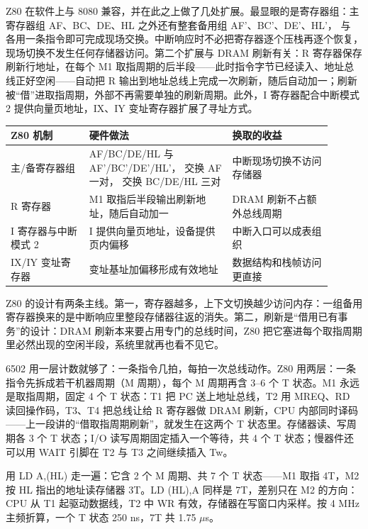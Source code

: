 Z80 在软件上与 8080 兼容，并在此之上做了几处扩展。最显眼的是寄存器组：主寄存器组 AF、BC、DE、HL 之外还有整套备用组 AF'、BC'、DE'、HL'， 与  各用一条指令即可完成现场交换。中断响应时不必把寄存器逐个压栈再逐个恢复，现场切换不发生任何存储器访问。第二个扩展与 DRAM 刷新有关：R 寄存器保存刷新行地址，在每个 M1 取指周期的后半段——此时指令字节已经读入、地址总线正好空闲——自动把 R 输出到地址总线上完成一次刷新，随后自动加一；刷新被“借”进取指周期，外部不再需要单独的刷新周期。此外，I 寄存器配合中断模式 2 提供向量页地址，IX、IY 变址寄存器扩展了寻址方式。

\begin{longtable}{L{0.22\linewidth}L{0.4\linewidth}L{0.28\linewidth}}
\toprule
Z80 机制 & 硬件做法 & 换取的收益 \\
\midrule
主/备寄存器组 & AF/BC/DE/HL 与 AF'/BC'/DE'/HL'， 交换 AF 一对， 交换 BC/DE/HL 三对 & 中断现场切换不访问存储器 \\
R 寄存器 & M1 取指后半段输出刷新地址，随后自动加一 & DRAM 刷新不占额外总线周期 \\
I 寄存器与中断模式 2 & I 提供向量页地址，设备提供页内偏移 & 中断入口可以成表组织 \\
IX/IY 变址寄存器 & 变址基址加偏移形成有效地址 & 数据结构和栈帧访问更直接 \\
\bottomrule
\end{longtable}

Z80 的设计有两条主线。第一，寄存器越多，上下文切换越少访问内存：一组备用寄存器换来的是中断响应里整段存储器往返的消失。第二，刷新是“借用已有事务”的设计：DRAM 刷新本来要占用专门的总线时间，Z80 把它塞进每个取指周期里必然出现的空闲半段，系统里就再也看不见它。

6502 用一层计数就够了：一条指令几拍，每拍一次总线动作。Z80 用两层：一条指令先拆成若干机器周期（M 周期），每个 M 周期再含 3--6 个 T 状态。M1 永远是取指周期，固定 4 个 T 状态：T1 把 PC 送上地址总线，T2 用 MREQ、RD 读回操作码，T3、T4 把总线让给 R 寄存器做 DRAM 刷新，CPU 内部同时译码——上一段讲的“借取指周期刷新”，就发生在这两个 T 状态里。存储器读、写周期各 3 个 T 状态；I/O 读写周期固定插入一个等待，共 4 个 T 状态；慢器件还可以用 WAIT 引脚在 T2 与 T3 之间继续插入 Tw。

用 LD A,(HL) 走一遍：它含 2 个 M 周期、共 7 个 T 状态——M1 取指 4T，M2 按 HL 指出的地址读存储器 3T。LD (HL),A 同样是 7T，差别只在 M2 的方向：CPU 从 T1 起驱动数据线，T2 中 WR 有效，存储器在写窗口内采样。按 4 MHz 主频折算，一个 T 状态 250 ns，7T 共 1.75 $\mu$s。

